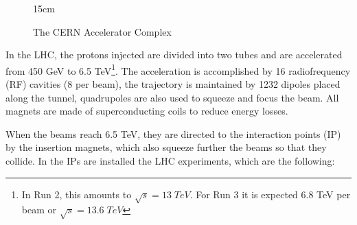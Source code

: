 \begin{figure}[!htm]{15cm}
\caption{The CERN Accelerator Complex}%
\label{fig:acc_complex}
\end{figure}

In the LHC, the protons injected are divided into two tubes and are accelerated from 450 GeV to 6.5 TeV\footnote{In Run 2, this amounts to $\sqrt{s} = 13 \; TeV$. For Run 3 it is expected 6.8 TeV per beam or $\sqrt{s} = 13.6 \; TeV$}. The acceleration is accomplished by 16 radiofrequency (RF) cavities (8 per beam), the trajectory is maintained by 1232 dipoles placed along the tunnel, quadrupoles are also used to squeeze and focus the beam. All magnets are made of superconducting coils to reduce energy losses.

When the beams reach 6.5 TeV, they are directed to the interaction points (IP) by the insertion magnets, which also squeeze further the beams so that they collide. In the IPs are installed the LHC experiments, which are the following:

